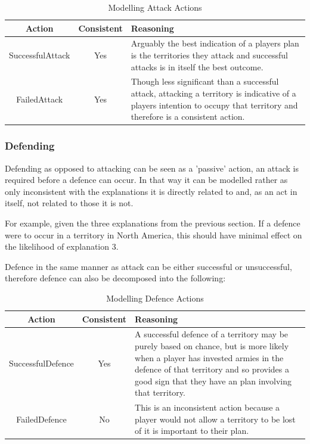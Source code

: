 \documentclass[parskip]{cs4rep}
\begin{document}
\begin{table}[ht]
\centering
\begin{tabular}{|c|c|p{8cm}|}
\hline 
\textbf{Action} & \textbf{Consistent}  & \textbf{Reasoning} \\ 
\hline 
SuccessfulAttack & Yes & Arguably the best indication of a players plan is the territories they attack and successful attacks is in itself the best outcome. \\ 
\hline 
FailedAttack & Yes & Though less significant than a successful attack, attacking a territory is indicative of a players intention to occupy that territory and therefore is a consistent action.\\ 
\hline
\end{tabular}
\caption{Modelling Attack Actions}
\label{table:attack-defend-modelling}
\end{table}

\newpage

\subsubsection{Defending}

Defending as opposed to attacking can be seen as a 'passive' action, an attack is required before a defence can occur. In that way it can be modelled rather as only inconsistent with the explanations it is directly related to and, as an act in itself, not related to those it is not.

For example, given the three explanations from the previous section. If a defence were to occur in a territory in North America, this should have minimal effect on the likelihood of explanation 3. 

Defence in the same manner as attack can be either successful or unsuccessful, therefore defence can also be decomposed into the following: 

\begin{table}[ht]
\centering
\begin{tabular}{|c|c|p{8cm}|}
\hline 
\textbf{Action} & \textbf{Consistent}  & \textbf{Reasoning} \\ 
\hline 
SuccessfulDefence & Yes & A successful defence of a territory may be purely based on chance, but is more likely when a player has invested armies in the defence of that territory and so provides a good sign that they have an plan involving that territory. \\ 
\hline 
FailedDefence & No & This is an inconsistent action because a player would not allow a territory to be lost of it is important to their plan. \\ 
\hline
\end{tabular}
\caption{Modelling Defence Actions}
\label{table:attack-defend-modelling}
\end{table}
\end{document}
